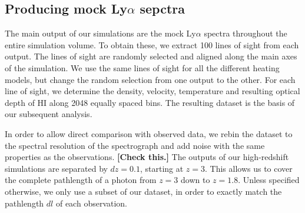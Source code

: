 \documentclass[numberedappendix]{emulateapj}
\newcommand\ALc[1]{{\color{red} \bf #1}} %
\begin{document}



\subsection{Producing mock Ly$\alpha$ sepctra}
The main output of our simulations are the mock Ly$\alpha$ spectra throughout the entire simulation volume. To obtain these, we extract 100 lines of sight from each output. The lines of sight are randomly selected and aligned along the main axes of the simulation. We use the same lines of sight for all the different heating models, but change the random selection from one output to the other. For each line of sight, we determine the density, velocity, temperature and resulting optical depth of HI along 2048 equally spaced bins.  The resulting dataset is the basis of our subsequent analysis.

In order to allow direct comparison with observed data, we rebin the dataset to the spectral resolution of the spectrograph and add noise with the same properties as the observations. \ALc{[Check this.]}  The outputs of our high-redshift simulations are separated by $dz=0.1$, starting at $z=3$. This allows us to cover the complete pathlength of a photon from $z=3$ down to $z=1.8$. Unless specified otherwise, we only use a subset of our dataset, in order to exactly match the pathlength $dl$ of each observation.
\end{document}
